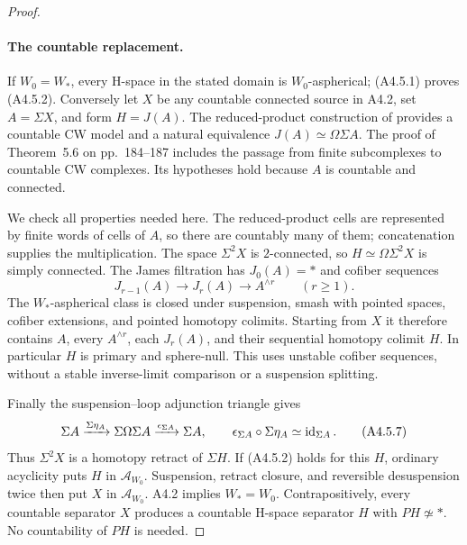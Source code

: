\begin{proof}
\paragraph{The countable replacement.}
If $W_0=W_*$, every H-space in the stated domain is
$W_0$-aspherical; \textup{(A4.5.1)} proves
\textup{(A4.5.2)}.  Conversely let $X$ be any countable
connected source in A4.2, set $A=\Sigma X$, and form $H=J(A)$.
The reduced-product construction of
\citet[Section~1 and Theorem~5.6]{A4James1955} provides a
countable CW model and a natural equivalence
$J(A)\simeq\Omega\Sigma A$.  The proof of Theorem~5.6 on
pp.~184--187 includes the passage from finite subcomplexes
to countable CW complexes.  Its hypotheses hold because
$A$ is countable and connected.

We check all properties needed here.  The reduced-product cells
are represented by finite words of cells of $A$, so there are
countably many of them; concatenation supplies the multiplication.
The space $\Sigma^2X$ is $2$-connected, so $H\simeq\Omega\Sigma^2X$
is simply connected.  The James filtration has
$J_0(A)=*$ and cofiber sequences
\[
       J_{r-1}(A)\longrightarrow J_r(A)\longrightarrow A^{\wedge r}
       \qquad(r\geq1).
 \tag{A4.5.6}
\]
The $W_*$-aspherical class is closed under suspension, smash with
pointed spaces, cofiber extensions, and pointed homotopy colimits.
Starting from $X$ it therefore contains $A$, every
$A^{\wedge r}$, each $J_r(A)$, and their sequential homotopy
colimit $H$.  In particular $H$ is primary and sphere-null.
This uses unstable cofiber sequences, without a stable
inverse-limit comparison or a suspension splitting.

Finally the suspension--loop adjunction triangle gives
\[
 \Sigma A\xrightarrow{\Sigma\eta_A}\Sigma\Omega\Sigma A
       \xrightarrow{\epsilon_{\Sigma A}}\Sigma A,
 \qquad
 \epsilon_{\Sigma A}\circ\Sigma\eta_A\simeq\operatorname{id}_{\Sigma A}.
 \tag{A4.5.7}
\]
Thus $\Sigma^2X$ is a homotopy retract of $\Sigma H$.
If \textup{(A4.5.2)} holds for this $H$, ordinary acyclicity
puts $H$ in $\mathcal A_{W_0}$.  Suspension, retract closure,
and reversible desuspension twice then put $X$ in
$\mathcal A_{W_0}$.  A4.2 implies $W_*=W_0$.
Contrapositively, every countable separator $X$ produces a
countable H-space separator $H$ with $PH\not\simeq *$.
No countability of $PH$ is needed.


\end{proof}
